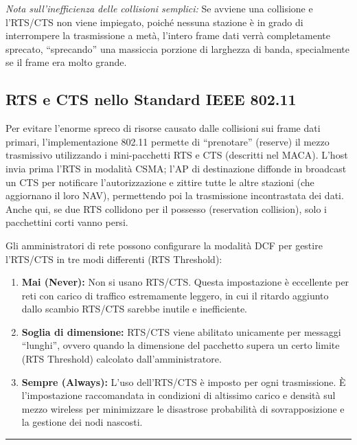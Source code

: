 \documentclass[
  italian,
  openany]{book}
\begin{document}
\emph{Nota sull'inefficienza delle collisioni semplici:} Se avviene una
collisione e l'RTS/CTS non viene impiegato, poiché nessuna stazione è in
grado di interrompere la trasmissione a metà, l'intero frame dati verrà
completamente sprecato, ``sprecando'' una massiccia porzione di
larghezza di banda, specialmente se il frame era molto grande.

\subsection{RTS e CTS nello Standard IEEE
802.11}\label{rts-e-cts-nello-standard-ieee-802.11}

Per evitare l'enorme spreco di risorse causato dalle collisioni sui
frame dati primari, l'implementazione 802.11 permette di ``prenotare''
(reserve) il mezzo trasmissivo utilizzando i mini-pacchetti RTS e CTS
(descritti nel MACA). L'host invia prima l'RTS in modalità CSMA; l'AP di
destinazione diffonde in broadcast un CTS per notificare
l'autorizzazione e zittire tutte le altre stazioni (che aggiornano il
loro NAV), permettendo poi la trasmissione incontrastata dei dati. Anche
qui, se due RTS collidono per il possesso (reservation collision), solo
i pacchettini corti vanno persi.

Gli amministratori di rete possono configurare la modalità DCF per
gestire l'RTS/CTS in tre modi differenti (RTS Threshold):

\begin{enumerate}
\def\labelenumi{\arabic{enumi}.}
\item
  \textbf{Mai (Never):} Non si usano RTS/CTS. Questa impostazione è
  eccellente per reti con carico di traffico estremamente leggero, in
  cui il ritardo aggiunto dallo scambio RTS/CTS sarebbe inutile e
  inefficiente.
\item
  \textbf{Soglia di dimensione:} RTS/CTS viene abilitato unicamente per
  messaggi ``lunghi'', ovvero quando la dimensione del pacchetto supera
  un certo limite (RTS Threshold) calcolato dall'amministratore.
\item
  \textbf{Sempre (Always):} L'uso dell'RTS/CTS è imposto per ogni
  trasmissione. È l'impostazione raccomandata in condizioni di altissimo
  carico e densità sul mezzo wireless per minimizzare le disastrose
  probabilità di sovrapposizione e la gestione dei nodi nascosti.
\end{enumerate}

\begin{center}\rule{0.5\linewidth}{0.5pt}\end{center}
\end{document}
